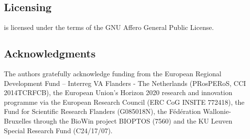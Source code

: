 \subsection{Licensing} \label{sec:licensing}
\asli{} is licensed under the terms of the GNU Affero General Public License.


\subsection{Acknowledgments}
The authors gratefully acknowledge funding from the European Regional Development Fund – Interreg VA Flanders - The Netherlands (PRosPERoS, CCI 2014\-TC\-RFCB), the European Union’s Horizon 2020 research and innovation programme via the European Research Council (ERC CoG INSITE 772418), the Fund for Scientific Research Flanders (G085018N), the Fédération Wallonie-Bruxelles through the BioWin project BIOPTOS (7560) and the KU Leuven Special Research Fund (C24/17/07).